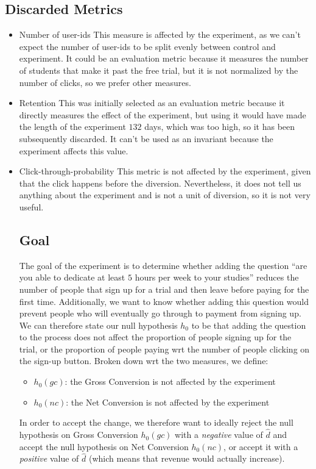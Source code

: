 \documentclass[12pt,a4paper]{article}
\begin{document}
\subsection{Discarded Metrics}
\begin{itemize}
\item Number of user-ids
This measure is affected by the experiment, as we can't expect the number of
user-ids to be split evenly between control and experiment. It could be an
evaluation metric because it measures the number of students that make it past
the free trial, but it is not normalized by the number of clicks, so we prefer
other measures.

\item Retention
This was initially selected as an evaluation metric because it directly measures
the effect of the experiment, but using it would have made the length of the
experiment $132$ days, which was too high, so it has been subsequently
discarded.  It can't be used as an invariant because the experiment affects this
value.

\item Click-through-probability
This metric is not affected by the experiment, given that the click happens
before the diversion. Nevertheless, it does not tell us anything about the
experiment and is not a unit of diversion, so it is not very useful.

\subsection{Goal}
The goal of the experiment is to determine whether adding the question ``are you
able to dedicate at least $5$ hours per week to your studies'' reduces the
number of people that sign up for a trial and then leave before paying for the
first time. Additionally, we want to know whether adding this question would
prevent people who will eventually go through to payment from signing up.
We can therefore state our null hypothesis $h_0$ to be that adding the question
to the process does not affect the proportion of people signing up for the
trial, or the proportion of people paying wrt the number of people clicking on
the sign-up button. Broken down wrt the two measures, we define:

\begin{itemize}
\item $h_0(gc)$: the Gross Conversion is not affected by the experiment
\item $h_0(nc)$: the Net Conversion is not affected by the experiment
\end{itemize}

In order to accept the change, we therefore want to ideally reject the null
hypothesis on Gross Conversion $h_0(gc)$ with a \emph{negative} value of
$\hat{d}$ and accept the null hypothesis on Net Conversion $h_0(nc)$, or accept
it with a \emph{positive} value of $\hat{d}$ (which means that revenue would
actually increase).

\end{itemize}
\end{document}
